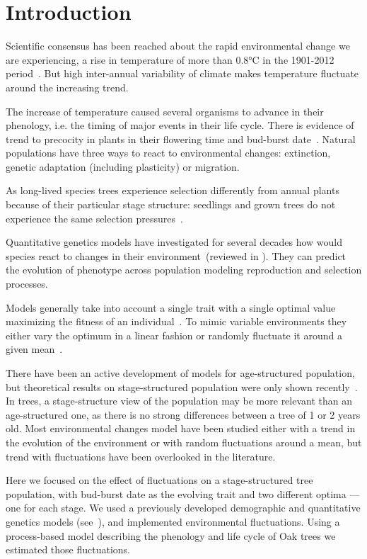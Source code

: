 \label{sec:Intro}
\section*{Introduction}

Scientific consensus has been reached about the rapid environmental change we are experiencing, a rise in temperature of more than 0.8°C in the 1901-2012 period~\citep{stocker_ipcc_2013}. But high inter-annual variability of climate makes temperature fluctuate around the increasing trend.

The increase of temperature caused several organisms to advance in their phenology, i.e. the timing of major events in their life cycle. There is evidence of trend to precocity in plants in their flowering time and bud-burst date~\citep{alberto_adaptive_2011, gienapp_predicting_2013}. Natural populations have three ways to react to environmental changes: extinction, genetic adaptation (including plasticity) or migration.

As long-lived species trees experience selection differently from annual plants because of their particular stage structure: seedlings and grown trees do not experience the same selection pressures~\citep{lande_quantitative_1982, coulson_dynamics_2008, barfield_evolution_2011, engen_evolution_2011}.

Quantitative genetics models have investigated for several decades how would species react to changes in their environment~(reviewed in \citealt{burger_quantitative-genetic_2004}). They can predict the evolution of phenotype across population modeling reproduction and selection processes.

Models generally take into account a single trait with a single optimal value maximizing the fitness of an individual~\citep{lande_quantitative_1982}. To mimic variable environments they either vary the optimum in a linear fashion or randomly fluctuate it around a given mean~\citep{lande_role_1996}.

There have been an active development of models for age-structured population, but theoretical results on stage-structured population were only shown recently~\citep{engen_evolution_2011}. In trees, a stage-structure view of the population may be more relevant than an age-structured one, as there is no strong differences between a tree of 1 or 2 years old. Most environmental changes model have been studied either with a trend in the evolution of the environment or with random fluctuations around a mean, but trend with fluctuations have been overlooked in the literature.

Here we focused on the effect of fluctuations on a stage-structured tree population, with bud-burst date as the evolving trait and two different optima — one for each stage.
We used a previously developed demographic and quantitative genetics models (see~), and implemented environmental fluctuations. Using a process-based model describing the phenology and life cycle of Oak trees we estimated those fluctuations.